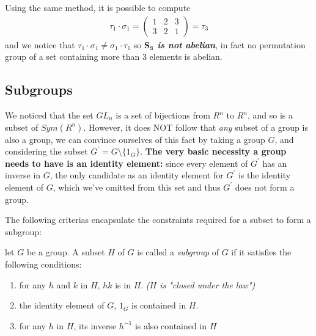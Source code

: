 Using the same method, it is possible to compute \begin{equation*}
\begin{split}
\tau_1 \cdot \sigma_1 = \begin{pmatrix}
1 & 2 & 3 \\
3 & 2 & 1
\end{pmatrix} = \tau_3
\end{split}
\end{equation*} and we notice that $\tau_1 \cdot \sigma_1 \neq \sigma_1 \cdot \tau_1$ so \textbf{\textit{$\bm{S_3}$ is not abelian}}, in fact no permutation group of a set containing more than 3 elements is abelian. 

\subsection{Subgroups}
We noticed that the set $GL_n$ is a set of bijections from $R^n$ to $R^n$, and so is a subset of $Sym(R^n)$. However, it does NOT follow that \textit{any} subset of a group is also a group, we can convince ourselves of this fact by taking a group $G$, and considering the subset $G^\prime = G \setminus \{1_G\}$. \textbf{The very basic necessity a group needs to have is an identity element:} since every element of $G^\prime$ has an inverse in $G$, the only candidate as an identity element for $G^\prime$ is the identity element of $G$, which we've omitted from this set and thus $G^\prime$ does not form a group. 

The following criterias encapsulate the constraints required for a subset to form a subgroup:

\begin{boxedDefinition}[Subgroups]\label{def:subgroup}
    let $G$ be a group. A subset $H$ of $G$ is called a \textit{subgroup} of $G$ if it satisfies the following conditions:
    \begin{enumerate}  
        \item \label{def:subgroup-closure} for any $h$ and $k$ in $H$, $hk$ is in $H$. \textit{($H$ is "closed under the law")}
        \item \label{def:subgroup-identity} the identity element of $G$, $1_G$ is contained in $H$.
        \item \label{def:subgroup-inverse} for any $h$ in $H$, its inverse $h^{-1}$ is also contained in $H$
    \end{enumerate}
\end{boxedDefinition}

